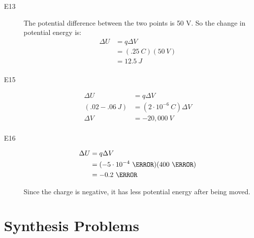 \documentclass{exam}
\begin{document}
\begin{description}
\item[E13]
The potential difference between the two points is 50 V.  So the change in potential energy is:
\begin{align*}
  \Delta U &= q \Delta V \\
           &= (.25 \ C)(50 \ V) \\
           &= 12.5 \ J \\
\end{align*}

\item[E15]
\begin{align*}
  \Delta U &= q \Delta V \\
  (.02 - .06 \ J) &= (2 \cdot 10^{-6} \ C) \Delta V \\
  \Delta V &= -20,000 \ V \\
\end{align*}

\item[E16]
\begin{align*}
  \Delta U &= q \Delta V \\
           &= (-5 \cdot 10^{-4} \ \coulomb) (400 \ \volt) \\
           &= -0.2 \ \joule \\
\end{align*}

Since the charge is negative, it has less potential energy after being moved.

\end{description}

\section{Synthesis Problems}
\end{document}
